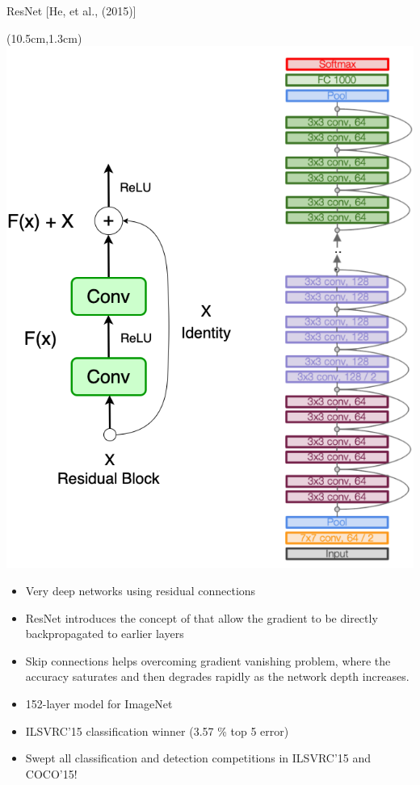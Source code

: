 \documentclass[serif, aspectratio=169]{beamer}
\begin{document}
\begin{frame}{ResNet [He, et al., (2015)]}
	
	\begin{textblock*}{5cm}(10.5cm,1.3cm) %
		\includegraphics[keepaspectratio, scale=0.23]{pic/resBlock}
	\end{textblock*}
	
	\begin{itemize}
		\item \color{red} Very deep networks using residual connections
		\item \color{blue} ResNet introduces the concept of \color{red}{skip connections \newline (or residual connections)} \color{blue} that allow the gradient to \newline be directly backpropagated to earlier layers
		\item \color{blue} Skip connections helps overcoming gradient vanishing \newline problem, where the accuracy saturates and then \newline degrades rapidly as the network depth increases.
		\item \color{blue} 152-layer model for ImageNet
		\item \color{blue} ILSVRC’15 classification winner (3.57 \% top 5 error)
		\item \color{blue} Swept all classification and detection competitions \newline in ILSVRC’15 and COCO’15!
	\end{itemize}
\end{frame}
\end{document}
